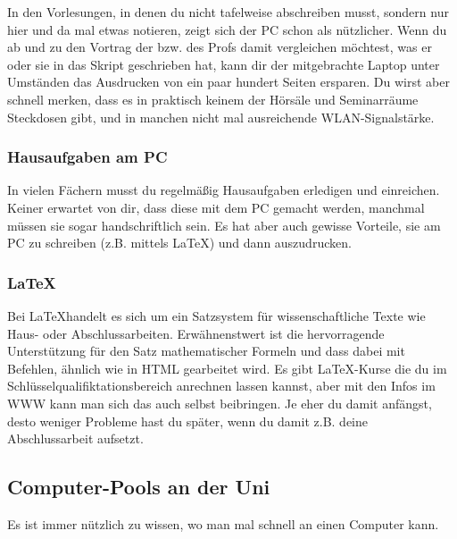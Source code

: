 			In den Vorlesungen, in denen du nicht tafelweise abschreiben musst, sondern nur hier und da mal etwas notieren, zeigt sich der PC schon als nützlicher. Wenn du ab und zu den Vortrag der bzw. des Profs damit vergleichen möchtest, was er oder sie in das Skript geschrieben hat, kann dir der mitgebrachte Laptop unter Umständen das Ausdrucken von ein paar hundert Seiten ersparen. Du wirst aber schnell merken, dass es in praktisch keinem der Hörsäle und Seminarräume Steckdosen gibt, und in manchen nicht mal ausreichende WLAN-Signalstärke.

		\subsubsection{Hausaufgaben am PC}
			In vielen Fächern musst du regelmäßig Hausaufgaben erledigen und einreichen. Keiner erwartet von dir, dass diese mit dem PC gemacht werden, manchmal müssen sie sogar handschriftlich sein. Es hat aber auch gewisse Vorteile, sie am PC zu schreiben (z.B. mittels \LaTeX) und dann auszudrucken. 

		\subsubsection{\LaTeX}
			Bei \LaTeX handelt es sich um ein Satzsystem für wissenschaftliche Texte wie Haus- oder Abschlussarbeiten. Erwähnenstwert ist die hervorragende Unterstützung für den Satz mathematischer Formeln und dass dabei mit Befehlen, ähnlich wie in HTML gearbeitet wird. Es gibt \LaTeX-Kurse die du im Schlüsselqualifiktationsbereich anrechnen lassen kannst, aber mit den Infos im WWW kann man sich das auch selbst beibringen. Je eher du damit anfängst, desto weniger Probleme hast du später, wenn du damit z.B. deine Abschlussarbeit aufsetzt.

		\subsection{Computer-Pools an der Uni}
			Es ist immer nützlich zu wissen, wo man mal schnell an einen Computer kann.

